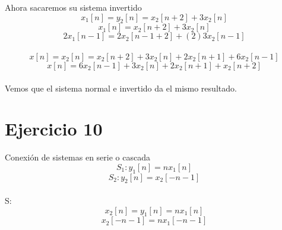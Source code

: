 \documentclass[10pt,a4paper]{report}
\begin{document}
Ahora sacaremos su sistema invertido\\
\begin{equation}
x_{1}\left [ n \right ]=y_{2}\left [ n \right ]=x_{2}\left [ n+2 \right ]+3x_{2}\left [ n \right ]
\end{equation}
\begin{equation}
x_{1}\left [ n \right ]=x_{2}\left [ n+2 \right ]+3x_{2}\left [ n \right ]
\end{equation}
\begin{equation}
2x_{1}\left [ n-1 \right ]=2x_{2}\left [ n-1+2 \right ]+(2)3x_{2}\left [ n-1 \right ]
\end{equation}\\

\begin{equation}
x\left [ n \right ]=x_{2}\left [ n \right ]=x_{2}\left [ n+2 \right ]+3x_{2}\left [ n \right ]+2x_{2}\left [ n+1 \right ]+6x_{2}\left [ n-1 \right ]
\end{equation}
\begin{equation}
x\left [ n \right ]=6x_{2}\left [ n-1 \right ]+3x_{2}\left [ n \right ]+2x_{2}\left [ n+1 \right ]+x_{2}\left [ n+2 \right ]
\end{equation}\\

Vemos que el sistema normal e invertido da el mismo resultado.

\section{Ejercicio 10}

Conexión de sistemas en serie o cascada\\

\begin{equation}
S_{1}: y_{1}\left [ n \right ]=nx_{1}\left [ n \right ]
\end{equation}
\begin{equation}
S_{2}: y_{2}\left [ n \right ]=x_{2}\left [ -n-1 \right ]
\end{equation}\\

S:\\

\begin{equation}
x_{2}\left [ n \right ]=y_{1}\left [ n \right ]=nx_{1}\left [ n \right ]
\end{equation}
\begin{equation}
x_{2}\left [ -n-1 \right ]=nx_{1}\left [ -n-1 \right ]
\end{equation}\\
\end{document}
